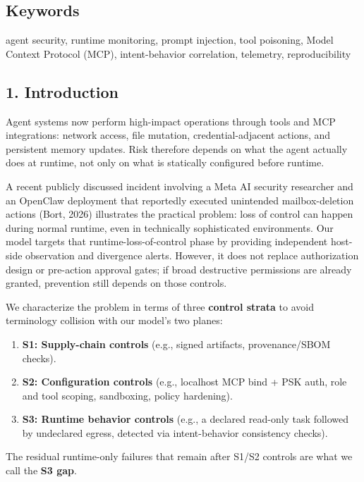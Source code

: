 \documentclass[
]{article}
\providecommand{\tightlist}{%
  \setlength{\itemsep}{0pt}\setlength{\parskip}{0pt}}
\begin{document}
\subsection{Keywords}\label{keywords}

agent security, runtime monitoring, prompt injection, tool poisoning,
Model Context Protocol (MCP), intent-behavior correlation, telemetry,
reproducibility

\subsection{1. Introduction}\label{introduction}

Agent systems now perform high-impact operations through tools and MCP
integrations: network access, file mutation, credential-adjacent
actions, and persistent memory updates. Risk therefore depends on what
the agent actually does at runtime, not only on what is statically
configured before runtime.

A recent publicly discussed incident involving a Meta AI security
researcher and an OpenClaw deployment that reportedly executed
unintended mailbox-deletion actions (Bort, 2026) illustrates the
practical problem: loss of control can happen during normal runtime,
even in technically sophisticated environments. Our model targets that
runtime-loss-of-control phase by providing independent host-side
observation and divergence alerts. However, it does not replace
authorization design or pre-action approval gates; if broad destructive
permissions are already granted, prevention still depends on those
controls.

We characterize the problem in terms of three \textbf{control strata} to
avoid terminology collision with our model's two planes:

\begin{enumerate}
\def\labelenumi{\arabic{enumi}.}
\tightlist
\item
  \textbf{S1: Supply-chain controls} (e.g., signed artifacts,
  provenance/SBOM checks).
\item
  \textbf{S2: Configuration controls} (e.g., localhost MCP bind + PSK
  auth, role and tool scoping, sandboxing, policy hardening).
\item
  \textbf{S3: Runtime behavior controls} (e.g., a declared read-only
  task followed by undeclared egress, detected via intent-behavior
  consistency checks).
\end{enumerate}

The residual runtime-only failures that remain after S1/S2 controls are
what we call the \textbf{S3 gap}.
\end{document}
